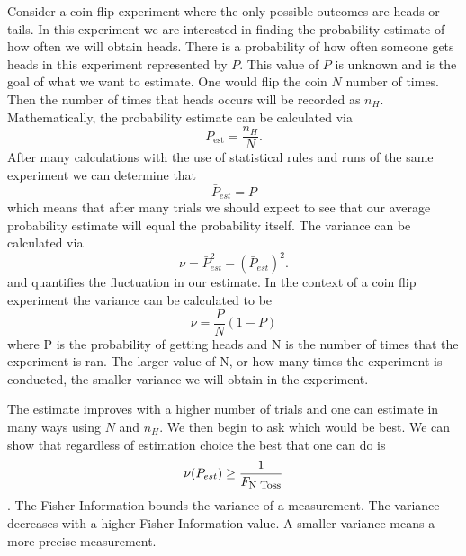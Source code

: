 \documentclass[twocolumn]{article}
\begin{document}
Consider a coin flip experiment where the only possible outcomes are heads or tails. In this experiment we are interested in finding the probability estimate of how often we will obtain heads. There is a probability of how often someone gets heads in this experiment represented by $P$. This value of $P$ is unknown and is the goal of what we want to estimate. One would flip the coin $N$ number of times. Then the number of times that heads occurs will be recorded as $n_H$. Mathematically, the probability estimate can be calculated via
\begin{equation}\label{eq:47}
P_{\text{est}}=\frac{n_H}{N}.
\end{equation}
After many calculations with the use of statistical rules and runs of the same experiment we can determine that
\begin{equation} \label{eq:48}
\bar{P}_{est}=P
\end{equation}
which means that after many trials we should expect to see that our average probability estimate will equal the probability itself. The variance can be calculated via
\begin{equation} \label{eq:49}
\nu=\bar{P}^2_{est}-(\bar{P}_{est})^2.
\end{equation}
and quantifies the fluctuation in our estimate. In the context of a coin flip experiment the variance can be calculated to be
\begin{equation} \label{eq:50}
\nu=\frac{P}{N}(1-P)
\end{equation}
where P is the probability of getting heads and N is the number of times that the experiment is ran. The larger value of N, or how many times the experiment is conducted, the smaller variance we will obtain in the experiment. 

The estimate improves with a higher number of trials and one can estimate in many ways using $N$ and $n_H$. We then begin to ask which would be best. We can show that regardless of estimation choice the best that one can do is
\begin{equation} \label{eq:51}
\nu(P_{est})\geq\frac{1}{F_{\text{\footnotesize{N Toss}}}}
\end{equation}
\cite{D. Collins}. The Fisher Information bounds the variance of a measurement.  The variance decreases with a higher Fisher Information value. A smaller variance means a more precise measurement.
\end{document}
